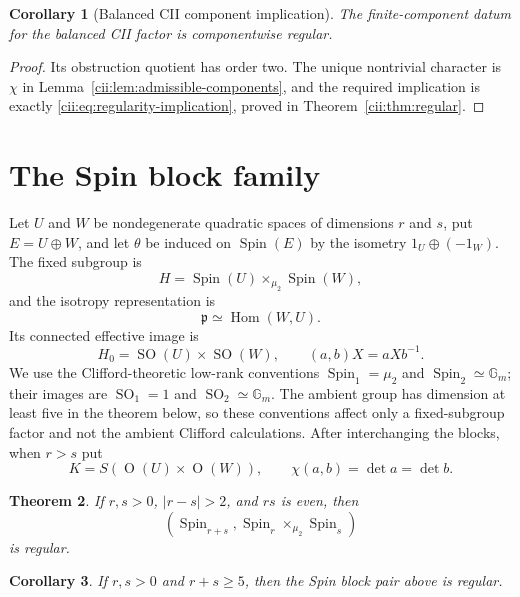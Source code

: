 \documentclass[11pt,reqno]{amsart}
\numberwithin{equation}{section}
\newtheorem{theorem}{Theorem}[section]
\newtheorem{corollary}[theorem]{Corollary}
\theoremstyle{definition}
\theoremstyle{remark}
\newcommand{\Gm}{\mathbb G_m}
\newcommand{\Spin}{\operatorname{Spin}}
\newcommand{\SO}{\operatorname{SO}}
\newcommand{\Or}{\operatorname{O}}
\newcommand{\Hom}{\operatorname{Hom}}
\newcommand{\fp}{\mathfrak p}
\begin{document}
\begin{corollary}[Balanced CII component implication]\label{cor:CII-component}
The finite-component datum for the balanced CII factor is componentwise
regular.
\end{corollary}

\begin{proof}
Its obstruction quotient has order two.  The unique nontrivial character is
$\chi$ in Lemma~\ref{cii:lem:admissible-components}, and the required implication
is exactly \eqref{cii:eq:regularity-implication}, proved in
Theorem~\ref{cii:thm:regular}.
\end{proof}

\section{The Spin block family}\label{sec:Spin-family}

Let $U$ and $W$ be nondegenerate quadratic spaces of dimensions $r$ and $s$,
put $E=U\oplus W$, and let $\theta$ be induced on $\Spin(E)$ by the isometry
$1_U\oplus(-1_W)$.  The fixed subgroup is
\[
 H=\Spin(U)\times_{\mu_2}\Spin(W),
\]
and the isotropy representation is
\begin{equation}\label{spin:eq:p-intro}
 \fp\simeq\Hom(W,U).
\end{equation}
Its connected effective image is
\begin{equation}\label{spin:eq:H0-action-intro}
 H_0=\SO(U)\times\SO(W),
 \qquad (a,b)X=aXb^{-1}.
\end{equation}
We use the Clifford-theoretic low-rank conventions
$\Spin_1=\mu_2$ and $\Spin_2\simeq\Gm$; their images are
$\SO_1=1$ and $\SO_2\simeq\Gm$.  The ambient group has dimension at
least five in the theorem below, so these conventions affect only a
fixed-subgroup factor and not the ambient Clifford calculations.
After interchanging the blocks, when $r>s$ put
\begin{equation}\label{spin:eq:Kchi-intro}
 K=S(\Or(U)\times\Or(W)),\qquad
 \chi(a,b)=\det a=\det b.
\end{equation}

\begin{theorem}\label{thm:Spin-residual}
If $r,s>0$, $|r-s|>2$, and $rs$ is even, then
\[
 (\Spin_{r+s},\Spin_r\times_{\mu_2}\Spin_s)
\]
is regular.
\end{theorem}

\begin{corollary}\label{cor:Spin-all}
If $r,s>0$ and $r+s\ge5$, then the Spin block pair above is regular.
\end{corollary}
\end{document}
